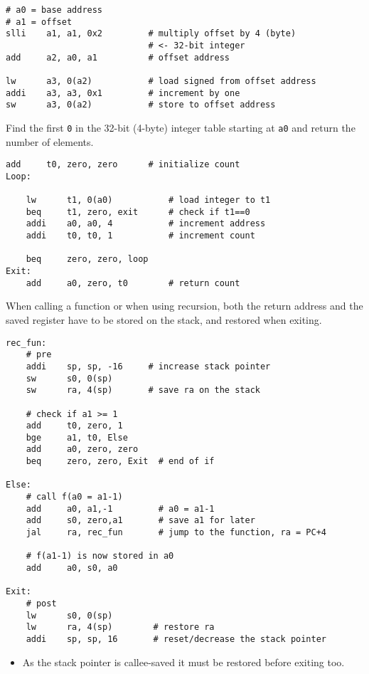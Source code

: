 \newpar{}

\begin{lstlisting}[language={[RISC-V]Assembler}]
# a0 = base address
# a1 = offset
slli    a1, a1, 0x2         # multiply offset by 4 (byte) 
                            # <- 32-bit integer
add     a2, a0, a1          # offset address
 
lw      a3, 0(a2)           # load signed from offset address
addi    a3, a3, 0x1         # increment by one
sw      a3, 0(a2)           # store to offset address
\end{lstlisting}

\newpar{}

Find the first \texttt{0} in the 32-bit (4-byte) integer table starting at \texttt{a0} and return the number of elements.
\begin{lstlisting}[language={[RISC-V]Assembler}]
    add     t0, zero, zero      # initialize count
Loop:

    lw      t1, 0(a0)           # load integer to t1
    beq     t1, zero, exit      # check if t1==0
    addi    a0, a0, 4           # increment address
    addi    t0, t0, 1           # increment count

    beq     zero, zero, loop
Exit:
    add     a0, zero, t0        # return count
\end{lstlisting}


\newpar{}

When calling a function or when using recursion, both the return address  and the saved register  have to be stored on the stack, and restored when exiting.
\begin{lstlisting}[language={[RISC-V]Assembler}]
rec_fun:
    # pre
    addi    sp, sp, -16     # increase stack pointer
    sw      s0, 0(sp)
    sw      ra, 4(sp)       # save ra on the stack

    # check if a1 >= 1
    add     t0, zero, 1
    bge     a1, t0, Else
    add     a0, zero, zero
    beq     zero, zero, Exit  # end of if

Else:
    # call f(a0 = a1-1)
    add     a0, a1,-1         # a0 = a1-1
    add     s0, zero,a1       # save a1 for later
    jal     ra, rec_fun       # jump to the function, ra = PC+4

    # f(a1-1) is now stored in a0
    add     a0, s0, a0

Exit:
    # post
    lw      s0, 0(sp)       
    lw      ra, 4(sp)        # restore ra
    addi    sp, sp, 16       # reset/decrease the stack pointer

\end{lstlisting}
\begin{itemize}
    \item As the stack pointer is callee-saved it must be restored before exiting too.
\end{itemize}


